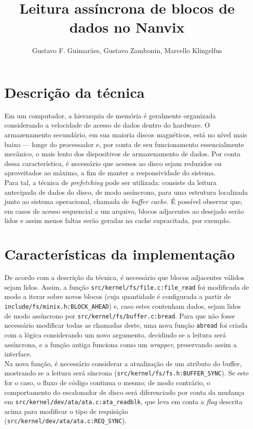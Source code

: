 \documentclass[12pt]{sftex/sftex}
\title{Leitura assíncrona de blocos de dados no Nanvix}
\author{Gustavo F. Guimarães, Gustavo Zambonin, Marcello Klingelfus}
\begin{document}
\maketitle

\section{Descrição da técnica}

Em um computador, a hierarquia de memória é geralmente organizada considerando
a velocidade de acesso de dados dentro do hardware. O armazenamento secundário,
em sua maioria discos magnéticos, está no nível mais baixo --- longe do
processador e, por conta de seu funcionamento essencialmente mecânico, o mais
lento dos dispositivos de armazenamento de dados. Por conta dessa
característica, é necessário que acessos ao disco sejam reduzidos ou
aproveitados ao máximo, a fim de manter a responsividade do sistema. \\

Para tal, a técnica de \emph{prefetching} pode ser utilizada: consiste da
leitura antecipada de dados do disco, de modo assíncrono, para uma estrutura
localizada junto ao sistema operacional, chamada de \emph{buffer cache}. É
possível observar que, em casos de acesso sequencial a um arquivo, blocos
adjacentes ao desejado serão lidos e assim menos faltas serão geradas na cache
supracitada, por exemplo.

\section{Características da implementação}

De acordo com a descrição da técnica, é necessário que blocos adjacentes
válidos sejam lidos. Assim, a função \texttt{src/kernel/fs/file.c:file\_read}
foi modificada de modo a iterar sobre novos blocos (cuja quantidade é
configurada a partir de \texttt{include/fs/minix.h:BLOCK\_AHEAD}) e, caso estes
contenham dados, sejam lidos de modo assíncrono por
\texttt{src/kernel/fs/buffer.c:bread}. Para que não fosse necessário modificar
todas as chamadas deste, uma nova função \texttt{abread} foi criada com a
lõgica considerando um novo argumento, decidindo se a leitura será assíncrona,
e a função antiga funciona como um \emph{wrapper}, preservando assim a
interface. \\

Na nova função, é necessário considerar a atualização de um atributo
do buffer, mostrando se a leitura será síncrona
(\texttt{src/kernel/fs/fs.h:BUFFER\_SYNC}). Se este for o caso, o fluxo de
código continua o mesmo; de modo contrário, o comportamento do escalonador de
disco será diferenciado por conta da mudança em
\texttt{src/kernel/dev/ata/ata.c:ata\_readblk}, que leva em conta a \emph{flag}
descrita acima para modificar o tipo de requisição
(\texttt{src/kernel/dev/ata/ata.c:REQ\_SYNC}).
\end{document}
